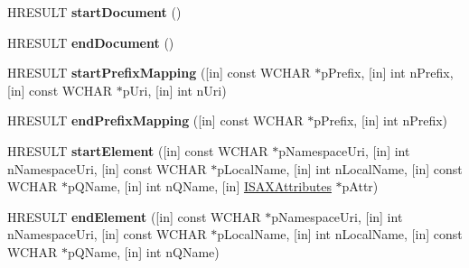 \begin{DoxyCompactItemize}
\mbox{\label{interface_m_s_x_m_l2_1_1_i_s_a_x_content_handler_a97b4a41e9d18c71dcb60e09fc2582e5d}} 
H\+R\+E\+S\+U\+LT {\bfseries start\+Document} ()
\item 
\mbox{\label{interface_m_s_x_m_l2_1_1_i_s_a_x_content_handler_a16cbfe414cee7b6d4e5da68de807078e}} 
H\+R\+E\+S\+U\+LT {\bfseries end\+Document} ()
\item 
\mbox{\label{interface_m_s_x_m_l2_1_1_i_s_a_x_content_handler_af135118b53eb5864490608b08ca4798e}} 
H\+R\+E\+S\+U\+LT {\bfseries start\+Prefix\+Mapping} (\mbox{[}in\mbox{]} const W\+C\+H\+AR $\ast$p\+Prefix, \mbox{[}in\mbox{]} int n\+Prefix, \mbox{[}in\mbox{]} const W\+C\+H\+AR $\ast$p\+Uri, \mbox{[}in\mbox{]} int n\+Uri)
\item 
\mbox{\label{interface_m_s_x_m_l2_1_1_i_s_a_x_content_handler_a06c723c48ab35b9ce3ad0b7c38b53bd6}} 
H\+R\+E\+S\+U\+LT {\bfseries end\+Prefix\+Mapping} (\mbox{[}in\mbox{]} const W\+C\+H\+AR $\ast$p\+Prefix, \mbox{[}in\mbox{]} int n\+Prefix)
\item 
\mbox{\label{interface_m_s_x_m_l2_1_1_i_s_a_x_content_handler_a11c994d3615fa625da53f6e561e32a46}} 
H\+R\+E\+S\+U\+LT {\bfseries start\+Element} (\mbox{[}in\mbox{]} const W\+C\+H\+AR $\ast$p\+Namespace\+Uri, \mbox{[}in\mbox{]} int n\+Namespace\+Uri, \mbox{[}in\mbox{]} const W\+C\+H\+AR $\ast$p\+Local\+Name, \mbox{[}in\mbox{]} int n\+Local\+Name, \mbox{[}in\mbox{]} const W\+C\+H\+AR $\ast$p\+Q\+Name, \mbox{[}in\mbox{]} int n\+Q\+Name, \mbox{[}in\mbox{]} \hyperlink{interface_m_s_x_m_l2_1_1_i_s_a_x_attributes}{I\+S\+A\+X\+Attributes} $\ast$p\+Attr)
\item 
\mbox{\label{interface_m_s_x_m_l2_1_1_i_s_a_x_content_handler_a1d200519c5037d0089f04bbe765d4e7d}} 
H\+R\+E\+S\+U\+LT {\bfseries end\+Element} (\mbox{[}in\mbox{]} const W\+C\+H\+AR $\ast$p\+Namespace\+Uri, \mbox{[}in\mbox{]} int n\+Namespace\+Uri, \mbox{[}in\mbox{]} const W\+C\+H\+AR $\ast$p\+Local\+Name, \mbox{[}in\mbox{]} int n\+Local\+Name, \mbox{[}in\mbox{]} const W\+C\+H\+AR $\ast$p\+Q\+Name, \mbox{[}in\mbox{]} int n\+Q\+Name)

\end{DoxyCompactItemize}
